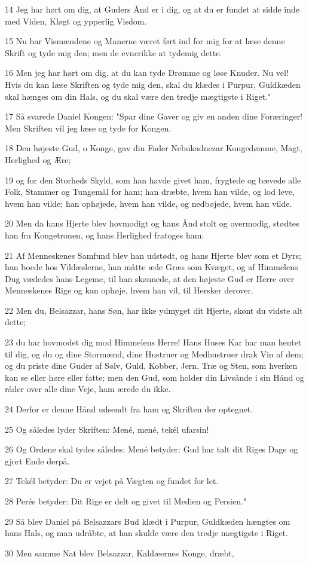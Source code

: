 \par 14 Jeg har hørt om dig, at Guders Ånd er i dig, og at du er fundet at sidde inde med Viden, Kløgt og ypperlig Visdom.
\par 15 Nu har Vismændene og Manerne været ført ind for mig for at læse denne Skrift og tyde mig den; men de evnerikke at tydemig dette.
\par 16 Men jeg har hørt om dig, at du kan tyde Drømme og løse Knuder. Nu vel! Hvis du kan læse Skriften og tyde mig den, skal du klædes i Purpur, Guldkæden skal hænges om din Hals, og du skal være den tredje mægtigste i Riget."
\par 17 Så svarede Daniel Kongen: "Spar dine Gaver og giv en anden dine Foræringer! Men Skriften vil jeg læse og tyde for Kongen.
\par 18 Den højeste Gud, o Konge, gav din Fader Nebukadnezar Kongedømme, Magt, Herlighed og Ære;
\par 19 og for den Storheds Skyld, som han havde givet ham, frygtede og bævede alle Folk, Stammer og Tungemål for ham; han dræbte, hvem han vilde, og lod leve, hvem han vilde; han ophøjede, hvem han vilde, og nedbøjede, hvem han vilde.
\par 20 Men da hans Hjerte blev hovmodigt og hans Ånd stolt og overmodig, stødtes han fra Kongetronen, og hans Herlighed fratoges ham.
\par 21 Af Menneskenes Samfund blev han udstødt, og hans Hjerte blev som et Dyrs; han boede hos Vildæslerne, han måtte æde Græs som Kvæget, og af Himmelens Dug vædedes hans Legeme, til han skønnede, at den højeste Gud er Herre over Menneskenes Rige og kan ophøje, hvem han vil, til Hersker derover.
\par 22 Men du, Belsazzar, hans Søn, har ikke ydmyget dit Hjerte, skønt du vidste alt dette;
\par 23 du har hovmodet dig mod Himmelens Herre! Hans Huses Kar har man hentet til dig, og du og dine Stormænd, dine Hustruer og Medhustruer drak Vin af dem; og du priste dine Guder af Sølv, Guld, Kobber, Jern, Træ og Sten, som hverken kan se eller høre eller fatte; men den Gud, som holder din Livsånde i sin Hånd og råder over alle dine Veje, ham ærede du ikke.
\par 24 Derfor er denne Hånd udsendt fra ham og Skriften der optegnet.
\par 25 Og således lyder Skriften: Mené, mené, tekél ufarsin!
\par 26 Og Ordene skal tydes således: Mené betyder: Gud har talt dit Riges Dage og gjort Ende derpå.
\par 27 Tekél betyder: Du er vejet på Vægten og fundet for let.
\par 28 Perés betyder: Dit Rige er delt og givet til Medien og Persien."
\par 29 Så blev Daniel på Belsazzars Bud klædt i Purpur, Guldkæden hængtes om hans Hals, og man udråbte, at han skulde være den tredje mægtigste i Riget.
\par 30 Men samme Nat blev Belsazzar, Kaldæernes Konge, dræbt,

